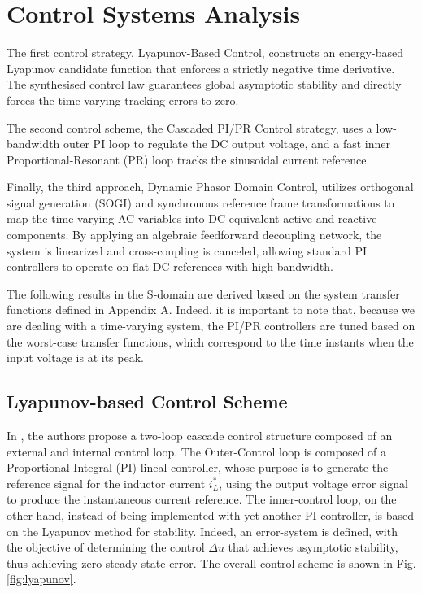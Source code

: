 \documentclass[DIV=calc, paper=a4, fontsize=11pt, twocolumn]{scrartcl}	 %
\begin{document}



\section{Control Systems Analysis}
The first control strategy, Lyapunov-Based Control, constructs an energy-based Lyapunov candidate function that enforces a strictly negative time derivative. The synthesised control law guarantees global asymptotic stability and directly forces the time-varying tracking errors to zero.

The second control scheme, the Cascaded PI/PR Control strategy, uses a low-bandwidth outer PI loop to regulate the DC output voltage, and a fast inner Proportional-Resonant (PR) loop tracks the sinusoidal current reference.

Finally, the third approach, Dynamic Phasor Domain Control, utilizes orthogonal signal generation (SOGI) and synchronous reference frame transformations to map the time-varying AC variables into DC-equivalent active and reactive components. By applying an algebraic feedforward decoupling network, the system is linearized and cross-coupling is canceled, allowing standard PI controllers to operate on flat DC references with high bandwidth.

The following results in the S-domain are derived based on the system transfer functions defined in Appendix A. Indeed, it is important to note that, because we are dealing with a time-varying system, the PI/PR controllers are tuned based on the worst-case transfer functions, which correspond to the time instants when the input voltage is at its peak.
\subsection{Lyapunov-based Control Scheme}
In \cite{TU}, the authors propose a two-loop cascade control structure composed of an external and internal control loop. The Outer-Control loop is composed of a Proportional-Integral (PI) lineal controller, whose purpose is to generate the reference signal for the inductor current $i^*_L$, using the output voltage error signal to produce the instantaneous current reference. The inner-control loop, on the other hand, instead of being implemented with yet another PI controller, is based on the Lyapunov method for stability. Indeed, an error-system is defined, with the objective of determining the control $\Delta u$ that achieves asymptotic stability, thus achieving zero steady-state error. The overall control scheme is shown in Fig. \ref{fig:lyapunov}.
\end{document}
